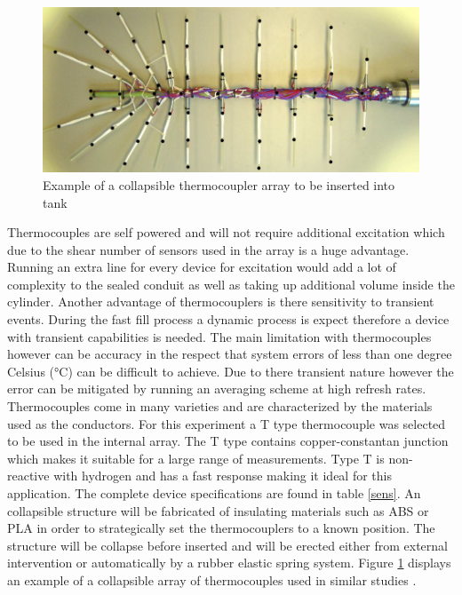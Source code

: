 \documentclass[paper=a4, fontsize=11pt, abstract=on]{scrartcl}
\numberwithin{equation}{section}		%
\numberwithin{figure}{section}			%
\numberwithin{table}{section}				%
\begin{document}
\begin{figure}[H]
\centering
\includegraphics[width=1.0\linewidth]{array}
\caption{Example of a collapsible thermocoupler array to be inserted into tank \cite{dick}}
\label{array}
\end{figure} 



 Thermocouples are self powered and will not require additional excitation which due to the shear number of sensors used in the array is a huge advantage. Running an extra line for every device for excitation would add a lot of complexity to the sealed conduit as well as taking up additional volume inside the cylinder. Another advantage of thermocouplers is there sensitivity to transient events. During the fast fill process a dynamic process is expect therefore a device with transient capabilities is needed. The main limitation with thermocouples however can be accuracy in the respect that system errors of less than one degree Celsius (°C) can be difficult to achieve. Due to there transient nature however the error can be mitigated by running an averaging scheme at high refresh rates. Thermocouples come in many varieties and are characterized by the materials used as the conductors. For this experiment a T type thermocouple was selected to be used in the internal array. The T type contains copper-constantan junction which makes it suitable for a large range of measurements. Type T is non-reactive with hydrogen and has a fast response making it ideal for this application. The complete device specifications are found in table \ref{sens}. An collapsible structure will be fabricated of insulating materials such as ABS or PLA in order to strategically set the thermocouplers to a known position. The structure will be collapse before inserted and will be erected either from external intervention or automatically by a rubber elastic spring system. Figure \ref{array} displays an example of a collapsible array of thermocouples used in similar studies \cite{dick}.
 
\end{document}

